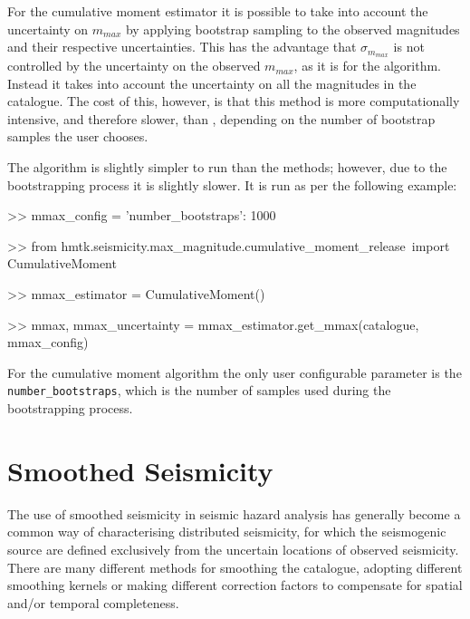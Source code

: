 For the cumulative moment estimator it is possible to take into account the uncertainty on $m_{max}$ by applying bootstrap sampling to the observed magnitudes and their respective uncertainties. This has the advantage that $\sigma_{m_{max}}$ is not controlled by the uncertainty on the observed $m_{max}$, as it is for the \cite{Kijko2004} algorithm. Instead it takes into account the uncertainty on all the magnitudes in the catalogue. The cost of this, however, is that this method is more computationally intensive, and therefore slower, than \cite{Kijko2004}, depending on the number of bootstrap samples the user chooses.

The algorithm is slightly simpler to run than the \cite{Kijko2004} methods; however, due to the bootstrapping process it is slightly slower. It is run as per the following example:

\begin{python}[frame=single]

>> mmax_config = {'number_bootstraps': 1000}
                       
>> from hmtk.seismicity.max_magnitude.cumulative_moment_release\
     import CumulativeMoment

>> mmax_estimator = CumulativeMoment()

>> mmax, mmax_uncertainty = mmax_estimator.get_mmax(catalogue,
                                                    mmax_config)
                
\end{python}

For the cumulative moment algorithm the only user configurable parameter is the \\ \verb=number_bootstraps=, which is the number of samples used during the bootstrapping process. 

\section{Smoothed Seismicity}

The use of smoothed seismicity in seismic hazard analysis has generally become a common way of characterising distributed seismicity, for which the seismogenic source are defined exclusively from the uncertain locations of observed seismicity. There are many different methods for smoothing the catalogue, adopting different smoothing kernels or making different correction factors to compensate for spatial and/or temporal completeness. 

\subsection{\cite{frankel1995}}

